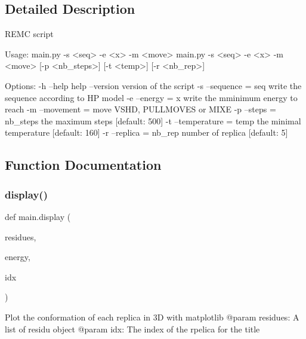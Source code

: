 \subsection{Detailed Description}
\begin{DoxyVerb}REMC script

Usage:
  main.py -s <seq> -e <x> -m <move>
  main.py -s <seq> -e <x> -m <move> [-p <nb_steps>] [-t <temp>] [-r <nb_rep>]

Options:
  -h --help                  help
  --version                  version of the script
  -s --sequence = seq        write the sequence according to HP model
  -e --energy = x            write the mminimum energy to reach
  -m --movement = move       VSHD, PULLMOVES or MIXE
  -p --steps = nb_steps      the maximum steps [default: 500]
  -t --temperature = temp    the minimal temperature [default: 160]
  -r --replica = nb_rep      number of replica [default: 5]
\end{DoxyVerb}
 

\subsection{Function Documentation}
\mbox{\label{namespacemain_aa6f8a1443820135b3cf84d9bafcc0028}} 
\subsubsection{\texorpdfstring{display()}{display()}}
{\footnotesize\ttfamily def main.\+display (\begin{DoxyParamCaption}\item[{}]{residues,  }\item[{}]{energy,  }\item[{}]{idx }\end{DoxyParamCaption})}

\begin{DoxyVerb}Plot the conformation of each replica in 3D with matplotlib
    @param residues: A list of residu object
    @param idx: The index of the rpelica for the title
\end{DoxyVerb}
 